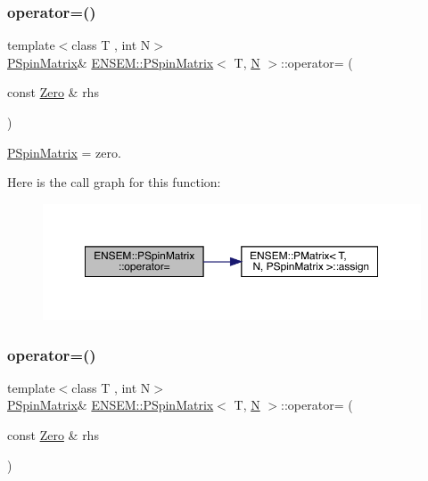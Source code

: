 \subsubsection{\texorpdfstring{operator=()}{operator=()}\hspace{0.1cm}{\footnotesize\ttfamily [1/9]}}
{\footnotesize\ttfamily template$<$class T , int N$>$ \\
\mbox{\hyperlink{classENSEM_1_1PSpinMatrix}{P\+Spin\+Matrix}}\& \mbox{\hyperlink{classENSEM_1_1PSpinMatrix}{E\+N\+S\+E\+M\+::\+P\+Spin\+Matrix}}$<$ T, \mbox{\hyperlink{adat__devel_2lib_2hadron_2operator__name__util_8cc_a7722c8ecbb62d99aee7ce68b1752f337}{N}} $>$\+::operator= (\begin{DoxyParamCaption}\item[{const \mbox{\hyperlink{structENSEM_1_1Zero}{Zero}} \&}]{rhs }\end{DoxyParamCaption})\hspace{0.3cm}{\ttfamily [inline]}}



\mbox{\hyperlink{classENSEM_1_1PSpinMatrix}{P\+Spin\+Matrix}} = zero. 

Here is the call graph for this function\+:
\nopagebreak
\begin{figure}[H]
\begin{center}
\leavevmode
\includegraphics[width=350pt]{d0/d1e/classENSEM_1_1PSpinMatrix_a2a776d9189f8d6fa8f9d9bc6758713c9_cgraph}
\end{center}
\end{figure}
\mbox{\label{classENSEM_1_1PSpinMatrix_a2a776d9189f8d6fa8f9d9bc6758713c9}} 
\subsubsection{\texorpdfstring{operator=()}{operator=()}\hspace{0.1cm}{\footnotesize\ttfamily [2/9]}}
{\footnotesize\ttfamily template$<$class T , int N$>$ \\
\mbox{\hyperlink{classENSEM_1_1PSpinMatrix}{P\+Spin\+Matrix}}\& \mbox{\hyperlink{classENSEM_1_1PSpinMatrix}{E\+N\+S\+E\+M\+::\+P\+Spin\+Matrix}}$<$ T, \mbox{\hyperlink{adat__devel_2lib_2hadron_2operator__name__util_8cc_a7722c8ecbb62d99aee7ce68b1752f337}{N}} $>$\+::operator= (\begin{DoxyParamCaption}\item[{const \mbox{\hyperlink{structENSEM_1_1Zero}{Zero}} \&}]{rhs }\end{DoxyParamCaption})\hspace{0.3cm}{\ttfamily [inline]}}




